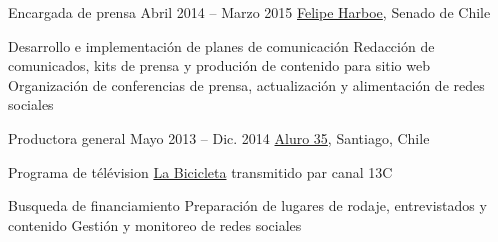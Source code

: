 \begin{joblist}
{		%
	}



\item[Encargada de prensa ]{Abril 2014 -- Marzo 2015}
     { \href{https://www.harboe.cl/}{Felipe Harboe}, Senado de Chile } 
	 {
                
		\iftbftiny \vspace{-0.5cm} \fi
			\begin{itemize}
			  \iftbftiny \setlength\itemsep{-3pt} \fi
			  \cvitem[\checkmark] Desarrollo e implementación de planes de comunicación
			  \cvitem[\checkmark] Redacción de comunicados, kits de prensa y produción de contenido para sitio web
			  \cvitem[\checkmark] Organización de conferencias de prensa, actualización y alimentación de redes sociales
			\end{itemize}     
			
	}
    
    
    
\item[Productora general]{Mayo 2013 -- Dic. 2014}
     {\href{https://www.aluro35.com/}  {Aluro 35}, Santiago, Chile}
     {Programa de télévision \href{http://www.13.cl/c/programas/la-bicicleta}{La Bicicleta} transmitido par canal 13C \\
			
		\iftbftiny \vspace{-0.5cm} \fi
			\begin{itemize}
			  \iftbftiny \setlength\itemsep{-3pt} \fi
			  \cvitem[\checkmark] Busqueda de financiamiento                
			  \cvitem[\checkmark] Preparación de lugares de rodaje, entrevistados y contenido
			  \cvitem[\checkmark] Gestión y monitoreo de redes sociales      
			\end{itemize}     
			
}
\end{joblist}
